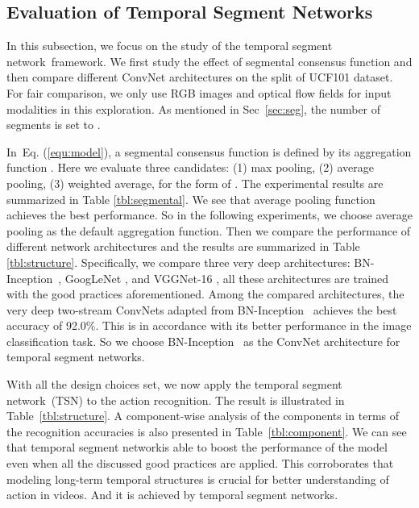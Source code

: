 \documentclass[runningheads]{llncs}
\newcommand{\SEGNET}{temporal segment network}
\begin{document}
\subsection{Evaluation of Temporal Segment Networks}

In this subsection, we focus on the study of the \SEGNET~framework. We first study the effect of segmental consensus function and then compare different ConvNet architectures on the split  of UCF101 dataset. For fair comparison, we only use RGB images and optical flow fields for input modalities in this exploration. As mentioned in Sec~\ref{sec:seg}, the number of segments  is set to .

In~Eq. (\ref{equ:model}), a segmental consensus function is defined by its aggregation function . Here we evaluate three candidates: (1) max pooling, (2) average pooling, (3) weighted average, for the form of . The experimental results are summarized in Table \ref{tbl:segmental}. We see that average pooling function achieves the best performance. So in the following experiments, we choose average pooling as the default aggregation function. 
Then we compare the performance of different network architectures and the results are summarized in Table \ref{tbl:structure}. Specifically, we compare three very deep architectures: BN-Inception~\cite{IoffeS15}, GoogLeNet \cite{SzegedyLJSRAEVR14}, and VGGNet-16 \cite{SimonyanZ14a}, all these architectures are trained with the good practices aforementioned. 
Among the compared architectures, the very deep two-stream ConvNets adapted from BN-Inception~\cite{IoffeS15} achieves the best accuracy of 92.0\%. 
This is in accordance with its better performance in the image classification task.
So we choose BN-Inception~\cite{IoffeS15} as the ConvNet architecture for \SEGNET s.

With all the design choices set, we now apply the \SEGNET~(TSN) to the action recognition. The result is illustrated in Table~\ref{tbl:structure}.
A component-wise analysis of the components in terms of the recognition accuracies is also presented in Table~\ref{tbl:component}.
We can see that \SEGNET is able to boost the performance of the model even when all the discussed good practices are applied.
This corroborates that modeling long-term temporal structures is crucial for better understanding of action in videos.
And it is achieved by \SEGNET s.
\end{document}
